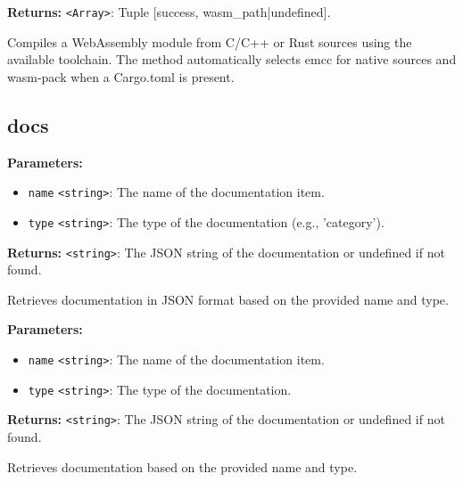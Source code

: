 \documentclass[12pt,a4paper]{article}
\begin{document}
\noindent \textbf{Returns:} \texttt{<Array>}: Tuple \textasciigrave{}[success, wasm\_path|undefined]\textasciigrave{}.

\noindent Compiles a WebAssembly module from C/C++ or Rust sources using the available toolchain.
The method automatically selects \textasciigrave{}emcc\textasciigrave{} for native sources and \textasciigrave{}wasm-pack\textasciigrave{} when a Cargo.toml is present.


\subsection{docs}
\vspace{5mm}
\noindent {}


\noindent \textbf{Parameters:}
\begin{itemize}
  \item \texttt{name} \texttt{<string>}: The name of the documentation item.
  \item \texttt{type} \texttt{<string>}: The type of the documentation (e.g., 'category').
\end{itemize}

\noindent \textbf{Returns:} \texttt{<string>}: The JSON string of the documentation or undefined if not found.

\noindent Retrieves documentation in JSON format based on the provided name and type.

\vspace{5mm}
\noindent {}


\noindent \textbf{Parameters:}
\begin{itemize}
  \item \texttt{name} \texttt{<string>}: The name of the documentation item.
  \item \texttt{type} \texttt{<string>}: The type of the documentation.
\end{itemize}

\noindent \textbf{Returns:} \texttt{<string>}: The JSON string of the documentation or undefined if not found.

\noindent Retrieves documentation based on the provided name and type.

\vspace{5mm}
\noindent {}
\end{document}
